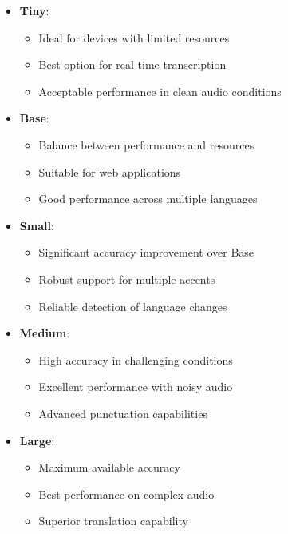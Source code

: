 \begin{itemize}
	\item \textbf{Tiny}:
	      \begin{itemize}
		      \item Ideal for devices with limited resources
		      \item Best option for real-time transcription
		      \item Acceptable performance in clean audio conditions
	      \end{itemize}

	\item \textbf{Base}:
	      \begin{itemize}
		      \item Balance between performance and resources
		      \item Suitable for web applications
		      \item Good performance across multiple languages
	      \end{itemize}

	\item \textbf{Small}:
	      \begin{itemize}
		      \item Significant accuracy improvement over Base
		      \item Robust support for multiple accents
		      \item Reliable detection of language changes
	      \end{itemize}

	\item \textbf{Medium}:
	      \begin{itemize}
		      \item High accuracy in challenging conditions
		      \item Excellent performance with noisy audio
		      \item Advanced punctuation capabilities
	      \end{itemize}

	\item \textbf{Large}:
	      \begin{itemize}
		      \item Maximum available accuracy
		      \item Best performance on complex audio
		      \item Superior translation capability
	      \end{itemize}
\end{itemize}

